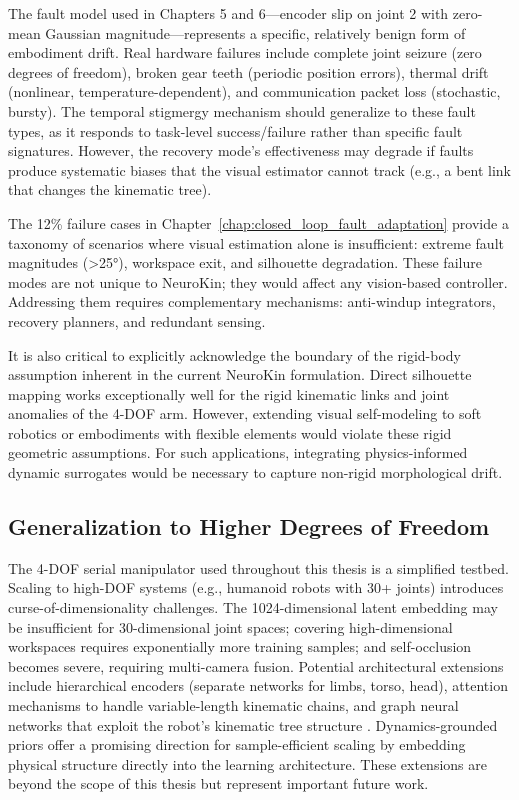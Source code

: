 \documentclass[12pt,a4paper,oneside]{report}
\begin{document}
The fault model used in Chapters 5 and 6—encoder slip on joint 2 with zero-mean Gaussian magnitude—represents a specific, relatively benign form of embodiment drift. Real hardware failures include complete joint seizure (zero degrees of freedom), broken gear teeth (periodic position errors), thermal drift (nonlinear, temperature-dependent), and communication packet loss (stochastic, bursty). The temporal stigmergy mechanism should generalize to these fault types, as it responds to task-level success/failure rather than specific fault signatures. However, the recovery mode's effectiveness may degrade if faults produce systematic biases that the visual estimator cannot track (e.g., a bent link that changes the kinematic tree).

The 12\% failure cases in Chapter~\ref{chap:closed_loop_fault_adaptation} provide a taxonomy of scenarios where visual estimation alone is insufficient: extreme fault magnitudes (>25°), workspace exit, and silhouette degradation. These failure modes are not unique to NeuroKin; they would affect any vision-based controller. Addressing them requires complementary mechanisms: anti-windup integrators, recovery planners, and redundant sensing.

It is also critical to explicitly acknowledge the boundary of the rigid-body assumption inherent in the current NeuroKin formulation. Direct silhouette mapping works exceptionally well for the rigid kinematic links and joint anomalies of the 4-DOF arm. However, extending visual self-modeling to soft robotics or embodiments with flexible elements would violate these rigid geometric assumptions. For such applications, integrating physics-informed dynamic surrogates would be necessary to capture non-rigid morphological drift.

\subsection{Generalization to Higher Degrees of Freedom}
\label{subsec:generalization_to_higher_degrees_of_freedom}

The 4-DOF serial manipulator used throughout this thesis is a simplified testbed. Scaling to high-DOF systems (e.g., humanoid robots with 30+ joints) introduces curse-of-dimensionality challenges. The 1024-dimensional latent embedding may be insufficient for 30-dimensional joint spaces; covering high-dimensional workspaces requires exponentially more training samples; and self-occlusion becomes severe, requiring multi-camera fusion. Potential architectural extensions include hierarchical encoders (separate networks for limbs, torso, head), attention mechanisms to handle variable-length kinematic chains, and graph neural networks that exploit the robot's kinematic tree structure \cite{patel2024getzero}. Dynamics-grounded priors offer a promising direction for sample-efficient scaling by embedding physical structure directly into the learning architecture. These extensions are beyond the scope of this thesis but represent important future work.
\end{document}
